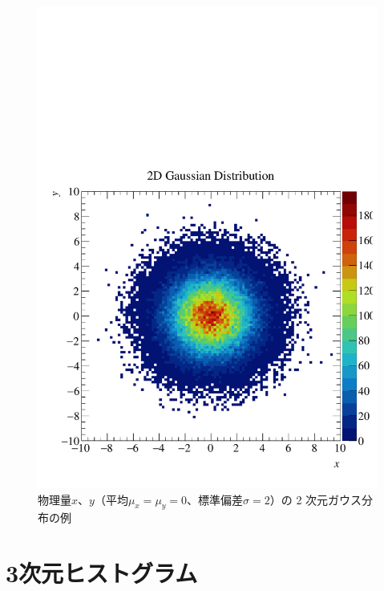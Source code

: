 \begin{figure}
  \centering
  \includegraphics[width=12cm]{fig/TH2D.pdf}
  \caption{物理量$x$、$y$（平均$\mu_x = \mu_y = 0$、標準偏差$\sigma = 2$）の 2 次元ガウス分布の例}
  \label{fig_TH2D_pdf}
\end{figure}

\section{3次元ヒストグラム}
